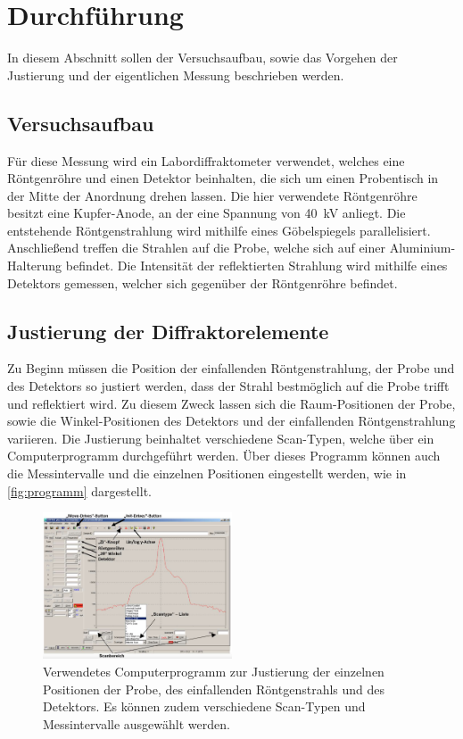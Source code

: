 \section{Durchführung}
\label{sec:durchfuehrung}

In diesem Abschnitt sollen der Versuchsaufbau,
sowie das Vorgehen der Justierung und der eigentlichen Messung beschrieben werden.


\subsection{Versuchsaufbau}

Für diese Messung wird ein Labordiffraktometer verwendet,
welches eine Röntgenröhre und einen Detektor beinhalten,
die sich um einen Probentisch in der Mitte der Anordnung drehen lassen.
Die hier verwendete Röntgenröhre besitzt eine Kupfer-Anode,
an der eine Spannung von \SI{40}{\kilo\volt} anliegt.
Die entstehende Röntgenstrahlung wird mithilfe eines Göbelspiegels parallelisiert.
Anschließend treffen die Strahlen auf die Probe,
welche sich auf einer Aluminium-Halterung befindet.
Die Intensität der reflektierten Strahlung wird mithilfe eines Detektors gemessen,
welcher sich gegenüber der Röntgenröhre befindet.


\subsection{Justierung der Diffraktorelemente}

Zu Beginn müssen die Position der einfallenden Röntgenstrahlung,
der Probe und des Detektors so justiert werden,
dass der Strahl bestmöglich auf die Probe trifft und reflektiert wird.
Zu diesem Zweck lassen sich die Raum-Positionen der Probe,
sowie die Winkel-Positionen des Detektors und der einfallenden Röntgenstrahlung variieren.
Die Justierung beinhaltet verschiedene Scan-Typen,
welche über ein Computerprogramm durchgeführt werden.
Über dieses Programm können auch die Messintervalle und die einzelnen Positionen eingestellt werden,
wie in \autoref{fig:programm} dargestellt.
\begin{figure}
    \centering
    \includegraphics[width=0.5\textwidth]{content/img/Abb_2.png}
    \caption{Verwendetes Computerprogramm zur Justierung der einzelnen Positionen der Probe,
    des einfallenden Röntgenstrahls und des Detektors.
    Es können zudem verschiedene Scan-Typen und Messintervalle ausgewählt werden. \cite{versuchsanleitung}}
    \label{fig:programm}
\end{figure}

